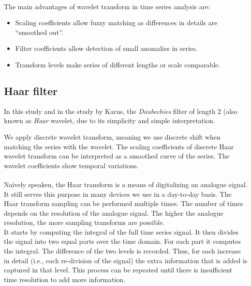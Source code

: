 \paragraph{}
The main advantages of wavelet transform in time series analysis are:
\begin{itemize}
	\item Scaling coefficients allow fuzzy matching as differences in details are
	``smoothed out''.
	\item Filter coefficients allow detection of small anomalies in series.
	\item Transform levels make series of different lengths or scale comparable.
\end{itemize}

\subsection{Haar filter}
In this study and in the study by Karus, the \emph{Daubechies }\rm filter of
length 2 (also known as \emph{Haar }\rm wavelet, due to its simplicity and
simple interpretation.

We apply discrete wavelet transform, meaning we use discrete shift when matching
the series with the wavelet. The scaling coefficients of discrete Haar wavelet
transform can be interpreted as a smoothed curve of the series. The wavelet
coefficients show temporal variations.

\paragraph{}
Naively speaken, the Haar transform is a means of digitalizing an analogue
signal. It still serves this purpose in many devices we use in a day-to-day
basis. The Haar transform sampling can be performed multiple times. The number
of times depends on the resolution of the analogue signal. The higher the
analogue resolution, the more sampling transforms are possible.\\

It starts by computing the integral of the full time series signal. It then
divides the signal into two equal parts over the time domain.
For each part it computes the integral. The difference of the two levels is
recorded. Thus, for each increase in detail (i.e., each re-division of the
signal) the extra information that is added is captured in that level. This
process can be repeated until there is insufficient time resolution to add more
information.\\

